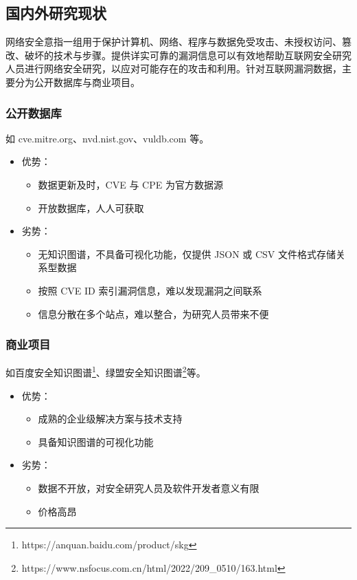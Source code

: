 \documentclass[a4paper,AutoFakeBold,oneside,12pt]{book}
\begin{document}
\subsection{国内外研究现状}

网络安全意指一组用于保护计算机、网络、程序与数据免受攻击、未授权访问、篡改、破坏的技术与步骤\cite{aftergood_cybersecurity_2017}。提供详实可靠的漏洞信息可以有效地帮助互联网安全研究人员进行网络安全研究，以应对可能存在的攻击和利用。针对互联网漏洞数据，主要分为公开数据库与商业项目。

\subsubsection{公开数据库}

如 cve.mitre.org、nvd.nist.gov、vuldb.com 等。

\begin{itemize}
	\item 优势：
	      \begin{itemize}
		      \item 数据更新及时，CVE 与 CPE 为官方数据源
		      \item 开放数据库，人人可获取
	      \end{itemize}
	\item 劣势：
	      \begin{itemize}
		      \item 无知识图谱，不具备可视化功能，仅提供 JSON 或 CSV 文件格式存储关系型数据
		      \item 按照 CVE ID 索引漏洞信息，难以发现漏洞之间联系
		      \item 信息分散在多个站点，难以整合，为研究人员带来不便
	      \end{itemize}
\end{itemize}

\subsubsection{商业项目}

如百度安全知识图谱\footnote{https://anquan.baidu.com/product/skg}、绿盟安全知识图谱\footnote{https://www.nsfocus.com.cn/html/2022/209{\_}0510/163.html}等。

\begin{itemize}
	\item 优势：
	      \begin{itemize}
		      \item 成熟的企业级解决方案与技术支持
		      \item 具备知识图谱的可视化功能
	      \end{itemize}
	\item 劣势：
	      \begin{itemize}
		      \item 数据不开放，对安全研究人员及软件开发者意义有限
		      \item 价格高昂
	      \end{itemize}
\end{itemize}
\end{document}
